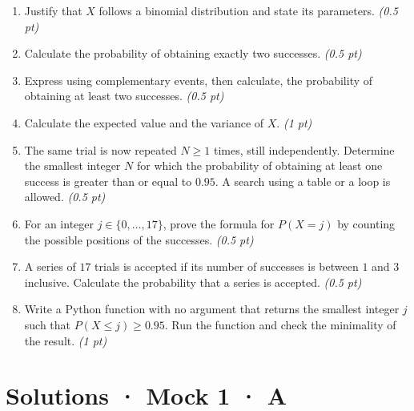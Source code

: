 \begin{enumerate}

\item Justify that $X$ follows a binomial distribution and state its parameters. \hfill\textit{(0.5 pt)}

\item Calculate the probability of obtaining exactly two successes. \hfill\textit{(0.5 pt)}

\item Express using complementary events, then calculate, the probability of obtaining at least two successes. \hfill\textit{(0.5 pt)}

\item Calculate the expected value and the variance of $X$. \hfill\textit{(1 pt)}

\item The same trial is now repeated $N\ge1$ times, still independently. Determine the smallest integer $N$ for which the probability of obtaining at least one success is greater than or equal to $0.95$. A search using a table or a loop is allowed. \hfill\textit{(0.5 pt)}

\item For an integer $j\in\{0,\ldots,17\}$, prove the formula for $P(X=j)$ by counting the possible positions of the successes. \hfill\textit{(0.5 pt)}

\item A series of $17$ trials is accepted if its number of successes is between $1$ and $3$ inclusive. Calculate the probability that a series is accepted. \hfill\textit{(0.5 pt)}

\item Write a Python function with no argument that returns the smallest integer $j$ such that $P(X\le j)\ge0.95$. Run the function and check the minimality of the result. \hfill\textit{(1 pt)}

\end{enumerate}

\ifprof\clearpage

\section*{Solutions · Mock 1 · A}\label{cor:5-3}

